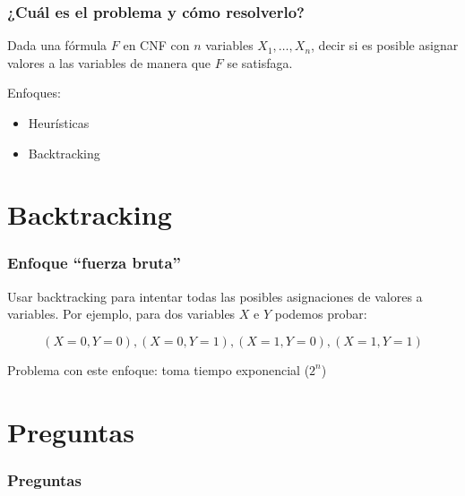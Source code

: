 \documentclass{beamer}
\begin{document}
\frame
{
  \frametitle{¿Cuál es el problema y cómo resolverlo?}

  Dada una fórmula $F$ en CNF con $n$ variables $X_1, \ldots, X_n$, decir si es
  posible asignar valores a las variables de manera que $F$ se satisfaga.

  Enfoques:

  \begin{itemize}
  \item Heurísticas
  \item Backtracking
  \end{itemize}
}

\section{Backtracking}

\frame
{
  \frametitle{Enfoque ``fuerza bruta''}

  Usar backtracking para intentar todas las posibles asignaciones de valores a variables. Por
  ejemplo, para dos variables $X$ e $Y$ podemos probar:

  $$
  (X=0,Y=0), (X=0,Y=1), (X=1,Y=0), (X=1,Y=1)
  $$

  Problema con este enfoque: toma tiempo exponencial ($2^n$)
}

\section{Preguntas}

\frame
{
  \frametitle{Preguntas}
}
\end{document}
